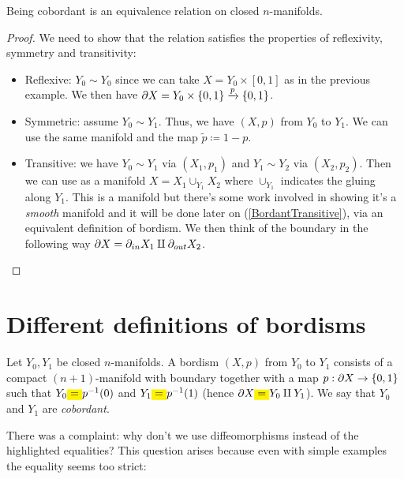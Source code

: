 \begin{thm}
\label{Cobordant Equiv}
Being cobordant is an equivalence relation on closed $n$-manifolds. 
\end{thm}
\begin{proof}
We need to show that the relation satisfies the properties of reflexivity, symmetry and transitivity:
\begin{itemize}
    \item Reflexive: $Y_0 \sim Y_0$ since we can take $X = Y_0 \times [0,1]$ as in the previous example. We then have $\partial X = Y_0 \times \{0,1\} \xrightarrow{p} \{0,1\}$. 
    \item Symmetric: assume $Y_0 \sim Y_1$. Thus, we have $(X,p)$ from $Y_0$ to $Y_1$. We can use the same manifold and the map $\tilde{p}\coloneqq 1-p$.
    \item Transitive: we have $Y_0 \sim Y_1$ via $(X_1, p_1)$ and $Y_1 \sim Y_2$ via $(X_2, p_2)$. 
    Then we can use as a manifold $X = X_1 \cup_{Y_1} X_2$ where $\cup_{Y_1}$ indicates the gluing along $Y_1$. 
    This is a manifold but there's some work involved in showing it's a \textit{smooth} manifold and it will be done later 
    on (\ref{BordantTransitive}), via an equivalent definition of bordism. We then think of the boundary in the following
     way $\partial X = \partial_{in} X_1 \amalg \partial_{out} X_2$.
\end{itemize}
\end{proof}

\section{Different definitions of bordisms} %
\label{sec:different_definitions_of_bordisms}

\begin{rmnd}
Let $Y_0, Y_1$ be closed $n$-manifolds. A bordism $(X,p)$ from $Y_0$ to $Y_1$ consists of a compact $(n+1)$-manifold with boundary together with a map $p: \partial X \to \{0,1\}$ such that $Y_0 \text{\colorbox{yellow}{=}} p^{-1}(0)$ and $Y_1 \text{\colorbox{yellow}{=}} p^{-1}(1)$ (hence $\de X \text{\colorbox{yellow}{=}}  Y_0 \amalg Y_1$). We say that $Y_0$ and $Y_1$ are \textit{cobordant}.
\end{rmnd}

\noindent There was a complaint: why don't we use diffeomorphisms instead of the highlighted equalities? This question arises because even with simple examples the equality seems too strict:

